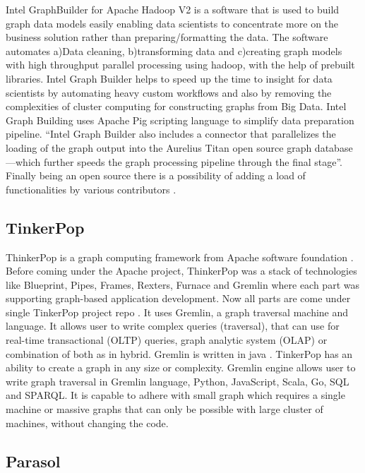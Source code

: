     Intel GraphBuilder for Apache Hadoop V2 is a software that is used
    to build graph data models easily enabling data scientists to
    concentrate more on the business solution rather than
    preparing/formatting the data. The software automates a)Data
    cleaning, b)transforming data and c)creating graph models with
    high throughput parallel processing using hadoop, with the help of
    prebuilt libraries. Intel Graph Builder helps to speed up the time
    to insight for data scientists by automating heavy custom
    workflows and also by removing the complexities of cluster
    computing for constructing graphs from Big Data. Intel Graph
    Building uses Apache Pig scripting language to simplify data
    preparation pipeline.  ``Intel Graph Builder also includes a
    connector that parallelizes the loading of the graph output into
    the Aurelius Titan open source graph database—which further speeds
    the graph processing pipeline through the final stage''.  Finally
    being an open source there is a possibility of adding a load of
    functionalities by various contributors \cite{graphbuilder}.

    
\subsection{TinkerPop}
    
    ThinkerPop is a graph computing framework from Apache software
    foundation \cite{www-ApacheTinkerPop}. Before coming under the
    Apache project, ThinkerPop was a stack of technologies like
    Blueprint, Pipes, Frames, Rexters, Furnace and Gremlin where each
    part was supporting graph-based application development. Now all
    parts are come under single TinkerPop project
    repo \cite{www-news}. It uses Gremlin, a graph traversal machine
    and language. It allows user to write complex queries (traversal),
    that can use for real-time transactional (OLTP) queries, graph
    analytic system (OLAP) or combination of both as in
    hybrid. Gremlin is written in
    java \cite{www-ApacheTinkerPopHome}. TinkerPop has an ability to
    create a graph in any size or complexity. Gremlin engine allows
    user to write graph traversal in Gremlin language, Python,
    JavaScript, Scala, Go, SQL and SPARQL. It is capable to adhere
    with small graph which requires a single machine or massive graphs
    that can only be possible with large cluster of machines, without
    changing the code.

\subsection{Parasol}

